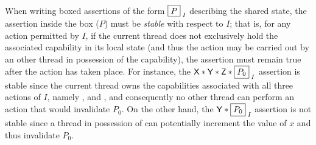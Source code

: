 When writing boxed assertions of the form $\boxed{P}_{\; I}$ describing the shared state, the assertion inside the box ($P$) must be \emph{stable} with respect to $I$; that is, for any action permitted by $I$, if the current thread does not exclusively hold the associated capability in its local state (and thus the action may be carried out by an other thread in possession of the capability), the assertion must remain true after the action has taken place. For instance, the $\textsf{X} * \textsf{Y} * \textsf{Z} * \boxed{P_0}_{\; I}$ assertion is stable since the current thread owns the capabilities associated with all three actions of $I$, namely ,  and , and consequently no other thread can perform an action that would invalidate $P_0$. On the other hand, the $\textsf{Y} * \boxed{P_0}_{\; I}$ assertion is not stable since a thread in possession of  can potentially increment the value of $x$ and thus invalidate $P_0$.
%
%
